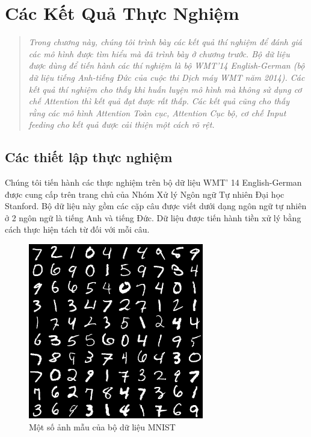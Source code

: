 \chapter{Các Kết Quả Thực Nghiệm}
\ifpdf
    \graphicspath{{Chapter4/Chapter4Figs/PNG/}{Chapter4/Chapter4Figs/PDF/}{Chapter4/Chapter4Figs/}}
\else
    \graphicspath{{Chapter4/Chapter4Figs/EPS/}{Chapter4/Chapter4Figs/}}
\fi
\label{chap_4}
\begin{quote}
\textit{Trong chương này, chúng tôi trình bày các kết quả thí nghiệm để đánh giá các mô hình được tìm hiểu mà đã trình bày ở chương trước. Bộ dữ liệu được dùng để tiến hành các thí nghiệm là bộ WMT'14 English-German (bộ dữ liệu tiếng Anh-tiếng Đức của cuộc thi Dịch máy WMT năm 2014). Các kết quả thí nghiệm cho thấy khi huấn luyện mô hình mà không sử dụng cơ chế Attention thì kết quả đạt được rất thấp. Các kết quả cũng cho thấy rằng các mô hình Attention Toàn cục, Attention Cục bộ, cơ chế Input feeding cho kết quả được cải thiện một cách rõ rệt.}
\end{quote}
\section{Các thiết lập thực nghiệm}
Chúng tôi tiến hành các thực nghiệm trên bộ dữ liệu WMT' 14 English-German được cung cấp trên trang chủ của Nhóm Xử lý Ngôn ngữ Tự nhiên Đại học Stanford. Bộ dữ liệu này gồm các cặp câu được viết dưới dạng ngôn ngữ tự nhiên ở 2 ngôn ngữ là tiếng Anh và tiếng Đức. Dữ liệu được tiến hành tiền xử lý bằng cách thực hiện tách từ đối với mỗi câu.

\begin{figure}
	\centering
	\includegraphics{MNIST}
	\caption{Một số ảnh mẫu của bộ dữ liệu MNIST}
	\label{fig_MNIST}
\end{figure}

